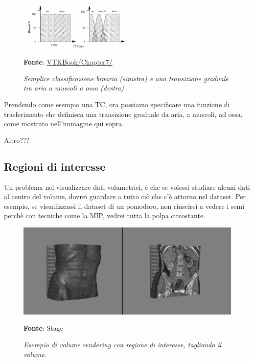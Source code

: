 \begin{figure}[h]
    \centering
    \includegraphics[width=0.5\textwidth]{immagini/volumerendering/functions.png}
    \caption{\textit{Semplice classificazione binaria (sinistra) e una transizione graduale tra aria a muscoli a ossa (destra).}}
    \textbf{Fonte}: \href{https://lorensen.github.io/VTKExamples/site/VTKBook/07Chapter7/}{VTKBook/Chapter7/}
    \label{fig: Volume Rendering Object-Order}
\end{figure}

Prendendo come esempio una TC, ora possiamo specificare una funzione di trasferimento che definisca una transizione graduale da aria, a muscoli, ad ossa, come mostrato nell'immagine qui sopra.

Altro???

\subsection{Regioni di interesse}\label{sec:regioni-di-interesse}
Un problema nel visualizzare dati volumetrici, è che se volessi studiare alcuni dati al centro del volume, dovrei guardare a tutto ciò che c'è attorno nel dataset. Per esempio, se visualizzassi il dataset di un pomodoro, non riuscirei a vedere i semi perchè con tecniche come la MIP, vedrei tutta la polpa circostante.

\begin{figure}[h]
    \centering
    \includegraphics[scale=0.3]{immagini/volumerendering/regionofinterest.png}
    \caption{\textit{Esempio di volume rendering con regione di interesse, tagliando il volume.}}
    \textbf{Fonte}: Stage
    \label{fig: Volume Rendering con Regione di Interesse}
\end{figure}

